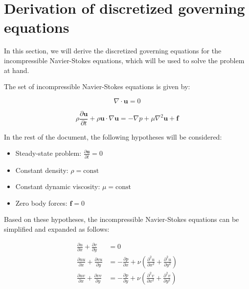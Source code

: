 \section{Derivation of discretized governing equations}
\label{sec:derivation_of_discretized_governing_equations}

In this section, we will derive the discretized governing equations for the incompressible Navier-Stokes equations, which will be used to solve the problem at hand.

The set of incompressible Navier-Stokes equations is given by:

\begin{equation*}
    \nabla \cdot {\mathbf{u}} = 0
    \label{eq:incompressible_navier_stokes_continuity}
\end{equation*}

\begin{equation*}
    \rho \frac{\partial \mathbf{u}}{\partial t} + \rho \mathbf{u} \cdot \nabla \mathbf{u} = -\nabla p + \mu \nabla^2 \mathbf{u} + \mathbf{f}
    \label{eq:incompressible_navier_stokes_momentum}
\end{equation*}

In the rest of the document, the following hypotheses will be considered:

\begin{itemize}
    \item Steady-state problem: $\frac{\partial \mathbf{u}}{\partial t} = 0$
    \item Constant density: $\rho = \text{const}$
    \item Constant dynamic viscosity: $\mu = \text{const}$
    \item Zero body forces: $\mathbf{f} = 0$
\end{itemize}

Based on these hypotheses, the incompressible Navier-Stokes equations can be simplified and expanded as follows:

\begin{align}
    \frac{\partial u}{\partial x} + \frac{\partial v}{\partial y}     & = 0                                                                                                                         \\
    \frac{\partial u u}{\partial x} + \frac{\partial v u}{\partial y} & = -\frac{\partial p}{\partial x} + \nu \left( \frac{\partial^2 u}{\partial x^2} + \frac{\partial^2 u}{\partial y^2} \right) \\
    \frac{\partial u v}{\partial x} + \frac{\partial v v}{\partial y} & = -\frac{\partial p}{\partial y} + \nu \left( \frac{\partial^2 v}{\partial x^2} + \frac{\partial^2 v}{\partial y^2} \right)
    \label{eq:incompressible_navier_stokes_steady_2D}
\end{align}

